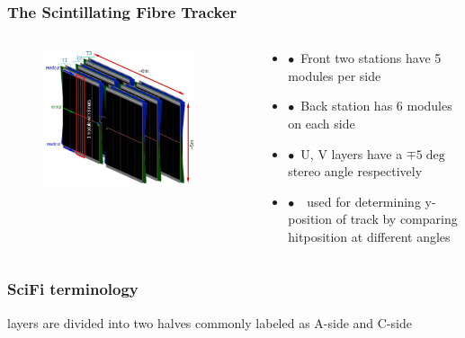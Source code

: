 \documentclass[aspectratio=1610, 12pt, xcolor=dvipsnames]{beamer}
\begin{document}
\begin{frame}\frametitle{The Scintillating Fibre Tracker}
  \begin{columns}
    \begin{column}[c]{0.48\textwidth}
      \begin{figure}
        \includegraphics[width=0.9\textwidth]{logos/scifi.png}
      \end{figure}
    \end{column}
    \begin{column}{0.48\textwidth}
      \begin{itemize}
        \item $\bullet$\, Front two stations have 5 modules per side
        \item $\bullet$\, Back station has 6 modules on each side
        \item $\bullet$\, U, V layers have a $\mp 5 \deg$ stereo angle respectively
        \item $\bullet$\, \to\, used for determining y-position of track by comparing hitposition at different angles
      \end{itemize}
    \end{column}
  \end{columns}
\end{frame}

\begin{frame}\frametitle{SciFi terminology}
layers are divided into two halves commonly labeled as A-side and C-side
  
\end{frame}
\end{document}
